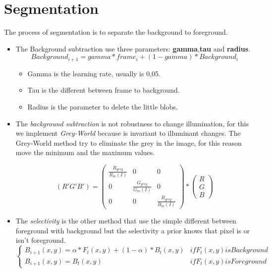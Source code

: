\section{Segmentation}
The process of segmentation is to separate the background to foreground.

\begin{itemize}
\item The Background subtraction use three parameters: \textbf{gamma},\textbf{tau} and \textbf{radius}.
	\begin{equation} Background_{i+1} = gamma*frame_{i} + (1-gamma)*Background_{i} \end{equation}
	\begin{itemize}
	\item Gamma is the learning rate, usually is 0,05.
	\item Tau is the different between frame to background.
	\item Radius is the parameter to delete the little blobs.
	\end{itemize}
	
\item The \textit{background subtraction} is not robustness to change illumination, for this we implement \textit{Grey-World} because is invariant to illuminant changes. 
The Grey-World method try to eliminate the grey in the image, for this reason move the minimum and the maximum values.

\begin{equation}
	( R' G' B' )= \left(
	\begin{array}{cccl}
		\frac{R_{grey}}{R_{m}(I)} & 0 & 0 \\
		0 & \frac{G_{grey}}{G_{m}(I)} & 0 \\
 		0 & 0 & \frac{B_{grey}}{B_{m}(I)}
	\end{array}
	\right) 
	* 
	\left(
	\begin{array}{c} R \\ G \\ B
	\end{array}
	\right)
\end{equation} 

\item The \textit{selectivity} is the other method that use the simple different between foreground with background but the selectivity a prior knows that pixel is or isn't foreground. 
	\begin{equation}
	\left \{
	\begin{array}{cccl}
		B_{i+1}(x,y) = \alpha * F_{t}(x,y)+(1-\alpha )* B_{t}(x,y) & if F_{t}(x,y) is Background \\
		B_{i+1}(x,y) = B_{t}(x,y) & if F_{t}(x,y) is Foreground
	\end{array} \right.
	\end{equation}



\end{itemize}
